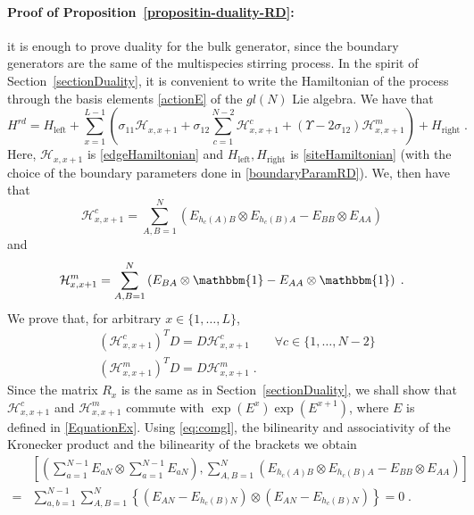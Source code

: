 \documentclass[10pt]{article}
\numberwithin{equation}{section}
\numberwithin{equation}{subsection}
\newcommand{\dt}{\;.}
\begin{document}
\paragraph{Proof of Proposition~\ref{propositin-duality-RD}:}
it is enough to prove duality for the bulk generator, since the boundary generators are the same of the multispecies stirring process. In the spirit of Section~\ref{sectionDuality}, it is convenient to write the Hamiltonian of the process through the basis elements \eqref{actionE} of the ${gl}(N)$ Lie algebra. We have that
\begin{equation}
	H^{rd}=H_{\text{left}}+\sum_{x=1}^{L-1}\left(\sigma_{11}\mathcal{H}_{x,x+1}+\sigma_{12}\sum_{c=1}^{N-2}\mathcal{H}_{x,x+1}^{c}+(\Upsilon-2\sigma_{12})\mathcal{H}_{x,x+1}^{m}\right)+H_{\text{right}}\dt
\end{equation}
Here, $\mathcal{H}_{x,x+1}$ is  \eqref{edgeHamiltonian}  and $H_{\text{left}},H_{\text{right}}$ is \eqref{siteHamiltonian} (with the choice of the boundary parameters done in \eqref{boundaryParamRD}). We, then have that 
\begin{equation}
	\mathcal{H}_{x,x+1}^{c}=\sum_{A,B=1}^{N}\left(E_{h_{c}(A)B}\otimes E_{h_{c}(B)A}-E_{BB}\otimes E_{AA}\right)
\end{equation}
and 
\begin{equation}
	\mathcal{H}_{x,x+1}^{m}=\sum_{A,B=1}^{N}\left(E_{BA}\otimes \mathbbm{1}-E_{AA}\otimes \mathbbm{1}\right)\dt
\end{equation}
We prove that, for arbitrary $x\in\{1,\ldots,L\}$,
\begin{align}
	&(\mathcal{H}_{x,x+1}^{c})^{T}D=D\mathcal{H}_{x,x+1}^{c}\qquad \forall c\in \{1,\ldots,N-2\}\label{cDualityRelation}\\
	&(\mathcal{H}_{x,x+1}^{m})^{T}D=D\mathcal{H}_{x,x+1}^{m}\label{mDualityRelation}\dt
\end{align}
Since the matrix $R_{x}$ is the same as in Section~\ref{sectionDuality}, we shall show that $\mathcal{H}_{x,x+1}^{c}$ and $\mathcal{H}_{x,x+1}^{m}$ commute with $\exp{(E^{x})}\exp{(E^{x+1})}$, where $E$ is defined in \eqref{EquationEx}. Using \eqref{eq:comgl}, the bilinearity and associativity of the Kronecker product and the bilinearity of the brackets we obtain 
\begin{align*}
	&\left[\left(\sum_{a=1}^{N-1}E_{aN}\otimes\sum_{a=1}^{N-1}E_{aN}\right), \sum_{A,B=1}^{N}\left(E_{h_{c}(A)B}\otimes E_{h_{c}(B)A} -E_{BB}\otimes E_{AA}\right)\right]
	\\=&
	\sum_{a,b=1}^{N-1}\sum_{A,B=1}^{N}\left\{\left(E_{AN}-E_{h_{c}(B)N}\right)\otimes \left(E_{AN}-E_{h_{c}(B)N}\right)\right\}=0\dt
\end{align*}
\end{document}
